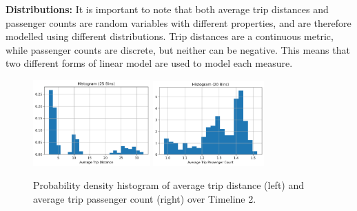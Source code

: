 \documentclass[11pt]{article}
\begin{document}
    
    
    


\textbf{Distributions:} 
It is important to note that both average trip distances and passenger counts 
are random variables with different properties, and are therefore modelled using different distributions.
Trip distances are a continuous metric, while passenger counts are discrete, but neither can be negative.
This means that two different forms of linear model are used to model each measure.

\begin{figure}[H]
    \includegraphics[width=0.40\textwidth]{../plots/histogram-Average Trip Distance-25-bins.png}
    \includegraphics[width=0.38\textwidth]{../plots/histogram-Average Trip Passenger Count-20-bins.png}
    \centering
    \caption{Probability density histogram of average trip distance (left) and average trip passenger count (right) over Timeline 2.} %
    \label{fig:hists}
\end{figure}
\end{document}
